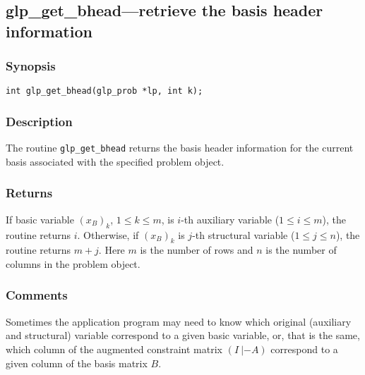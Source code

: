 
\newpage

\subsection{glp\_get\_bhead---retrieve the basis header information}

\subsubsection*{Synopsis}

\begin{verbatim}
int glp_get_bhead(glp_prob *lp, int k);
\end{verbatim}

\subsubsection*{Description}

The routine \verb|glp_get_bhead| returns the basis header information
for the current basis associated with the specified problem object.

\subsubsection*{Returns}

If basic variable $(x_B)_k$, $1\leq k\leq m$, is $i$-th auxiliary
variable ($1\leq i\leq m$), the routine returns $i$. Otherwise, if
$(x_B)_k$ is $j$-th structural variable ($1\leq j\leq n$), the routine
returns $m+j$. Here $m$ is the number of rows and $n$ is the number of
columns in the problem object.

\subsubsection*{Comments}

Sometimes the application program may need to know which original
(auxiliary and structural) variable correspond to a given basic
variable, or, that is the same, which column of the augmented constraint
matrix $(I\ |-\!A)$ correspond to a given column of the basis matrix
$B$.

\def\arraystretch{1}

